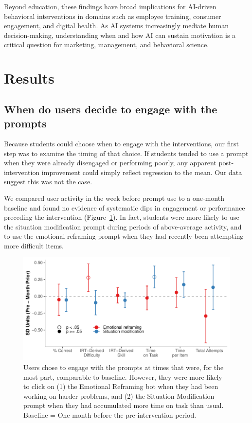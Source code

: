 \documentclass[11pt]{report}
\begin{document}
\begin{mainf}
Beyond education, these findings have broad implications for AI-driven behavioral interventions in domains such as employee training, consumer engagement, and digital health. 
As AI systems increasingly mediate human decision-making, understanding when and how AI can sustain motivation is a critical question for marketing, management, and behavioral science.

\section{Results} 

\subsection{When do users decide to engage with the prompts}
Because students could choose when to engage with the interventions, our first step was to examine the timing of that choice.
If students tended to use a prompt when they were already disengaged or performing poorly, any apparent post-intervention improvement could simply reflect regression to the mean.
Our data suggest this was not the case. 

We compared user activity in the week before prompt use to a one-month baseline and found no evidence of systematic dips in engagement or performance preceding the intervention (Figure~\ref{fig:when_engage}). 
In fact, students were more likely to use the situation modification prompt during periods of above-average activity, and to use the emotional reframing prompt when they had recently been attempting more difficult items.


\begin{figure}[ht]
    \centering
    \includegraphics[width=\linewidth]{when_engage.pdf}
    \caption{Users chose to engage with the prompts at times that were, for the most part, comparable to baseline. However, they were more likely to click on (1) the Emotional Reframing bot when they had been working on harder problems, and (2) the Situation Modification prompt when they had accumulated more time on task than usual. Baseline = One month before the pre-intervention period.}
    \label{fig:when_engage}
\end{figure}


\end{mainf}
\end{document}
